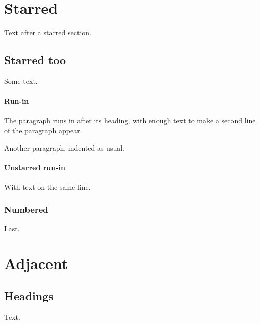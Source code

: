\documentclass{article}
\begin{document}
\section*{Starred}
\label{s:star}Text after a starred section.
\subsection*{Starred too}
Some text.
\paragraph*{Run-in}
\label{p:runin}
The paragraph runs in after its heading, with enough text to make
a second line of the paragraph appear.

Another paragraph, indented as usual.
\paragraph{Unstarred run-in} With text on the same line.
\subsubsection{Numbered}
Last.
\section{Adjacent}\subsection{Headings}\label{s:adj}
Text.
\end{document}
